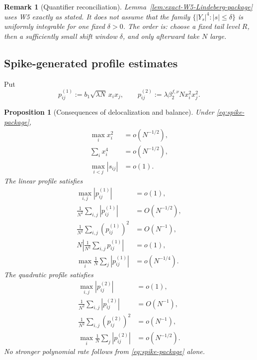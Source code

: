 \documentclass[10pt,a4paper]{amsart}
\newtheorem{proposition}[theorem]{Proposition}
\newtheorem{remark}[theorem]{Remark}
\begin{document}
\begin{remark}[Quantifier reconciliation]
Lemma~\ref{lem:exact-W5-Lindeberg-package} uses W5 exactly as stated.  It does
not assume that the family \(\{|Y_s|^4:|s|\le\delta\}\) is uniformly
integrable for one fixed \(\delta>0\).  The order is: choose a fixed tail level
\(R\), then a sufficiently small shift window \(\delta\), and only afterward
take \(N\) large.
\end{remark}

\subsection{Spike-generated profile estimates}

Put
\begin{equation}\label{eq:profiles-package}
 p_{ij}^{(1)}:=b_1\sqrt{\lambda N}\,x_ix_j,
 \qquad
 p_{ij}^{(2)}:=\lambda\beta_2^{f,\nu}N x_i^2x_j^2.
\end{equation}

\begin{proposition}[Consequences of delocalization and balance]
\label{prop:spike-rates-package}
Under \eqref{eq:spike-package},
\begin{align}
 \max_i x_i^2&=o(N^{-1/2}),
 \label{eq:max-square-package}\\
 \sum_i x_i^4&=o(N^{-1/2}),
 \label{eq:fourth-spike-package}\\
 \max_{i<j}|s_{ij}|&=o(1).
 \label{eq:max-microshift-package}
\end{align}
The linear profile satisfies
\begin{align}
 \max_{i,j}|p_{ij}^{(1)}|&=o(1),
 \label{eq:p1-max-package}\\
 \frac1{N^2}\sum_{i,j}|p_{ij}^{(1)}|&=O(N^{-1/2}),
 \label{eq:p1-L1-package}\\
 \frac1{N^2}\sum_{i,j}(p_{ij}^{(1)})^2&=O(N^{-1}),
 \label{eq:p1-L2-package}\\
 N\left|\frac1{N^2}\sum_{i,j}p_{ij}^{(1)}\right|&=o(1),
 \label{eq:p1-signed-package}\\
 \max_i\frac1N\sum_j|p_{ij}^{(1)}|&=o(N^{-1/4}).
 \label{eq:p1-row-package}
\end{align}
The quadratic profile satisfies
\begin{align}
 \max_{i,j}|p_{ij}^{(2)}|&=o(1),
 \label{eq:p2-max-package}\\
 \frac1{N^2}\sum_{i,j}|p_{ij}^{(2)}|&=O(N^{-1}),
 \label{eq:p2-L1-package}\\
 \frac1{N^2}\sum_{i,j}(p_{ij}^{(2)})^2&=o(N^{-1}),
 \label{eq:p2-L2-package}\\
 \max_i\frac1N\sum_j|p_{ij}^{(2)}|&=o(N^{-1/2}).
 \label{eq:p2-row-package}
\end{align}
No stronger polynomial rate follows from \eqref{eq:spike-package} alone.
\end{proposition}
\end{document}
